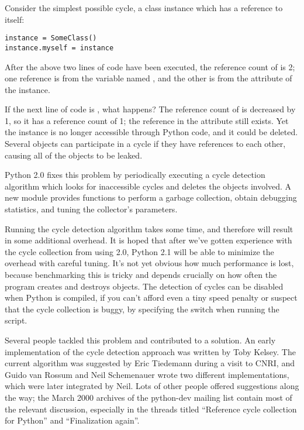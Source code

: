 \documentclass{howto}
\begin{document}
Consider the simplest possible cycle, 
a class instance which has a reference to itself:

\begin{verbatim}
instance = SomeClass()
instance.myself = instance
\end{verbatim}

After the above two lines of code have been executed, the reference
count of  is 2; one reference is from the variable
named , and the other is from the 
attribute of the instance.  

If the next line of code is , what happens?  The
reference count of  is decreased by 1, so it has a
reference count of 1; the reference in the  attribute
still exists.  Yet the instance is no longer accessible through Python
code, and it could be deleted.  Several objects can participate in a
cycle if they have references to each other, causing all of the
objects to be leaked.

Python 2.0 fixes this problem by periodically executing a cycle
detection algorithm which looks for inaccessible cycles and deletes
the objects involved.  A new  module provides functions to
perform a garbage collection, obtain debugging statistics, and tuning
the collector's parameters.

Running the cycle detection algorithm takes some time, and therefore
will result in some additional overhead.  It is hoped that after we've
gotten experience with the cycle collection from using 2.0, Python 2.1
will be able to minimize the overhead with careful tuning.  It's not
yet obvious how much performance is lost, because benchmarking this is
tricky and depends crucially on how often the program creates and
destroys objects.  The detection of cycles can be disabled when Python
is compiled, if you can't afford even a tiny speed penalty or suspect
that the cycle collection is buggy, by specifying the
 switch when running the
 script.

Several people tackled this problem and contributed to a solution.  An
early implementation of the cycle detection approach was written by
Toby Kelsey.  The current algorithm was suggested by Eric Tiedemann
during a visit to CNRI, and Guido van Rossum and Neil Schemenauer
wrote two different implementations, which were later integrated by
Neil.  Lots of other people offered suggestions along the way; the
March 2000 archives of the python-dev mailing list contain most of the
relevant discussion, especially in the threads titled ``Reference
cycle collection for Python'' and ``Finalization again''.
\end{document}
